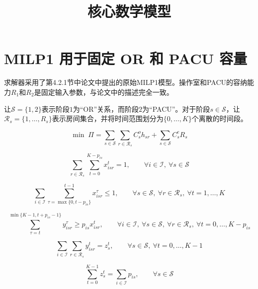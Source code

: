 \documentclass{article}
\title{核心数学模型}
\date{}
\begin{document}
\maketitle

\section*{MILP1 用于固定 OR 和 PACU 容量}

求解器采用了第4.2.1节中论文中提出的原始MILP1模型。操作室和PACU的容纳能力$R_1$和$R_2$是固定输入参数，与论文中的描述完全一致。 

让$\mathcal{S} = \{1,2\}$表示阶段$1$为“OR”关系，而阶段$2$为“PACU”。对于阶段$s \in \mathcal{S}$，让$\mathcal{R}_s = \{1,\ldots,R_s\}$表示房间集合，并将时间范围划分为$\{0,\ldots,K\}$个离散的时间段。

\begin{equation}
\min \; \Pi =
\sum_{s \in \mathcal{S}} \sum_{r \in \mathcal{R}_s} C_s^o h_{sr}
+
\sum_{s \in \mathcal{S}} C_s^e R_s
\tag{1}
\end{equation}

\begin{equation}
\sum_{r \in \mathcal{R}_s} \sum_{t=0}^{K-p_{is}} x_{isr}^t = 1,
\qquad
\forall i \in \mathcal{I},\ \forall s \in \mathcal{S}
\tag{2}
\end{equation}

\begin{equation}
\sum_{i \in \mathcal{I}} \sum_{\tau=\max\{0,t-p_{is}\}}^{t-1} x_{isr}^{\tau} \le 1,
\qquad
\forall s \in \mathcal{S},\ \forall r \in \mathcal{R}_s,\ \forall t = 1,\ldots,K
\tag{3}
\end{equation}

\begin{equation}
\sum_{\tau=t}^{\min\{K-1,t+p_{is}-1\}} y_{isr}^{\tau} \ge p_{is} x_{isr}^t,
\qquad
\forall i \in \mathcal{I},\ \forall s \in \mathcal{S},\ \forall r \in \mathcal{R}_s,\ \forall t = 0,\ldots,K-p_{is}
\tag{4}
\end{equation}

\begin{equation}
\sum_{i \in \mathcal{I}} \sum_{r \in \mathcal{R}_s} y_{isr}^t = z_s^t,
\qquad
\forall s \in \mathcal{S},\ \forall t = 0,\ldots,K-1
\tag{5}
\end{equation}

\begin{equation}
\sum_{t=0}^{K-1} z_s^t = \sum_{i \in \mathcal{I}} p_{is},
\qquad
\forall s \in \mathcal{S}
\tag{6}
\end{equation}
\end{document}
